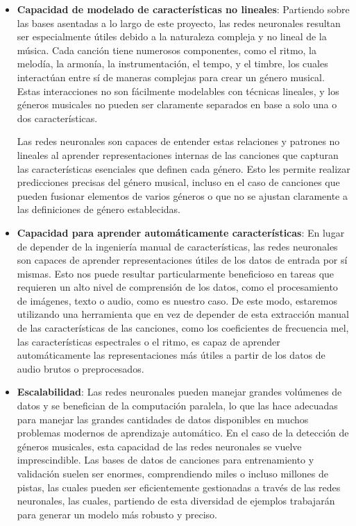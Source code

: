 \begin{itemize}
\tightlist

\item \textbf{Capacidad de modelado de características no lineales}: Partiendo sobre las bases asentadas a lo largo de este proyecto, las redes neuronales resultan ser especialmente útiles debido a la naturaleza compleja y no lineal de la música. Cada canción tiene numerosos componentes, como el ritmo, la melodía, la armonía, la instrumentación, el tempo, y el timbre, los cuales interactúan entre sí de maneras complejas para crear un género musical. Estas interacciones no son fácilmente modelables con técnicas lineales, y los géneros musicales no pueden ser claramente separados en base a solo una o dos características.

Las redes neuronales son capaces de entender estas relaciones y patrones no lineales al aprender representaciones internas de las canciones que capturan las características esenciales que definen cada género. Esto les permite realizar predicciones precisas del género musical, incluso en el caso de canciones que pueden fusionar elementos de varios géneros o que no se ajustan claramente a las definiciones de género establecidas.

\item \textbf{Capacidad para aprender automáticamente características}: En lugar de depender de la ingeniería manual de características, las redes neuronales son capaces de aprender representaciones útiles de los datos de entrada por sí mismas. Esto nos puede resultar particularmente beneficioso en tareas que requieren un alto nivel de comprensión de los datos, como el procesamiento de imágenes, texto o audio, como es nuestro caso. De este modo, estaremos utilizando una herramienta que en vez de depender de esta extracción manual de las características de las canciones, como los coeficientes de frecuencia mel, las características espectrales o el ritmo, es capaz de aprender automáticamente las representaciones más útiles a partir de los datos de audio brutos o preprocesados.

\item \textbf{Escalabilidad}: Las redes neuronales pueden manejar grandes volúmenes de datos y se benefician de la computación paralela, lo que las hace adecuadas para manejar las grandes cantidades de datos disponibles en muchos problemas modernos de aprendizaje automático. En el caso de la detección de géneros musicales, esta capacidad de las redes neuronales se vuelve imprescindible. Las bases de datos de canciones para entrenamiento y validación suelen ser enormes, comprendiendo miles o incluso millones de pistas, las cuales pueden ser eficientemente gestionadas a través de las redes neuronales, las cuales, partiendo de esta diversidad de ejemplos trabajarán para generar un modelo más robusto y preciso. 

\end{itemize}

